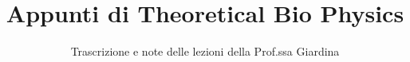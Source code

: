 \documentclass[a4paper,12pt]{article}
\title{Appunti di Theoretical Bio Physics}
\author{Trascrizione e note delle lezioni della Prof.ssa Giardina}
\date{}
\begin{document}
\maketitle
\projectintro
\tableofcontents
\newpage

% 
% 
% 
% 
% 
\end{document}
